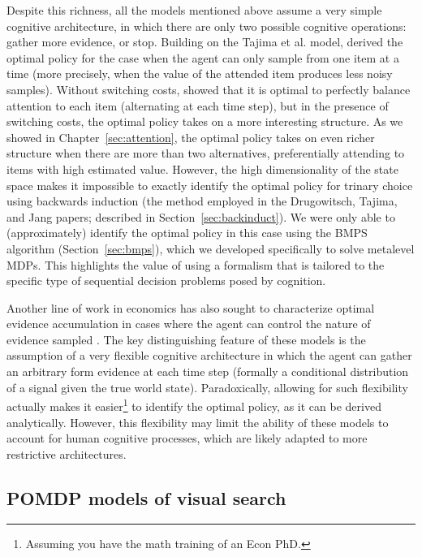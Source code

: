 Despite this richness, all the models mentioned above assume a very simple cognitive architecture, in which there are only two possible cognitive operations: gather more evidence, or stop. Building on the Tajima et al. model, \citet{jang2021optimal} derived the optimal policy for the case when the agent can only sample from one item at a time (more precisely, when the value of the attended item produces less noisy samples). Without switching costs, \citet{fudenberg2018speed} showed that it is optimal to perfectly balance attention to each item (alternating at each time step), but in the presence of switching costs, the optimal policy takes on a more interesting structure. As we showed in Chapter~\ref{sec:attention}, the optimal policy takes on even richer structure when there are more than two alternatives, preferentially attending to items with high estimated value. However, the high dimensionality of the state space makes it impossible to exactly identify the optimal policy for trinary choice using backwards induction (the method employed in the Drugowitsch, Tajima, and Jang papers; described in Section~\ref{sec:backinduct}). We were only able to (approximately) identify the optimal policy in this case using the BMPS algorithm (Section~\ref{sec:bmps}), which we developed specifically to solve metalevel MDPs. This highlights the value of using a formalism that is tailored to the specific type of sequential decision problems posed by cognition.

Another line of work in economics has also sought to characterize optimal evidence accumulation in cases where the agent can control the nature of evidence sampled \citep{woodford2014stochastic,hebert2017rational}. The key distinguishing feature of these models is the assumption of a very flexible cognitive architecture in which the agent can gather an arbitrary form evidence at each time step (formally a conditional distribution of a signal given the true world state). Paradoxically, allowing for such flexibility actually makes it easier\footnote{%
  Assuming you have the math training of an Econ PhD.
} to identify the optimal policy, as it can be derived analytically. However, this flexibility may limit the ability of these models to account for human cognitive processes, which are likely adapted to more restrictive architectures.

\subsection{POMDP models of visual search}

